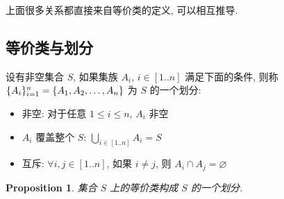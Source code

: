 \documentclass[UTF8]{ctexart}
\theoremstyle{mystyle}
\newtheorem{proposition}{Proposition}[section]
\theoremstyle{myremark}
\theoremstyle{plain}
\DeclarePairedDelimiter\set{\{}{\}}
\begin{document}
上面很多关系都直接来自等价类的定义, 可以相互推导.

\subsection{等价类与划分}
\begin{definition}
    设有非空集合 $ S $, 如果集族 $ A_i $, $ i \in [1..n] $ 满足下面的条件, 则称 $ \set{A_i}_{i = 1}^n = \set{A_1, A_2, \dots, A_n} $ 为 $ S $ 的一个划分:
    \begin{itemize}
        \item 非空: 对于任意 $ 1 \leqslant i \leqslant n $, $ A_i $ 非空
        \item $ {A_i} $ 覆盖整个 $ S $: $ \displaystyle \bigcup_{i \in [1..n]} A_i = S $
        \item 互斥: $ \forall i, j \in [1..n] $, 如果 $ i \neq j $, 则 $ A_i \cap A_j = \varnothing $
    \end{itemize}
\end{definition}

\begin{proposition}
    集合 $ S $ 上的等价类构成 $ S $ 的一个划分.
\end{proposition}
\end{document}
